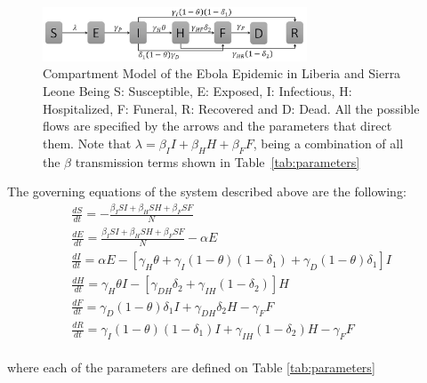 \documentclass[10pt]{article}
\begin{document}
\begin{figure}
  \centering
  \includegraphics[width=0.7\textwidth]{compartment}
  \caption{Compartment Model of the Ebola Epidemic in Liberia and Sierra Leone \newline  Being S: Susceptible, E: Exposed, I: Infectious, H: Hospitalized, F: Funeral,  R: Recovered and D: Dead. All the possible flows are specified by the arrows and the parameters that direct them. Note that $\lambda = \beta_{I}I+\beta_{H}H+\beta_{F}F $, being a combination of all the $\beta$ transmission terms shown in Table~\ref{tab:parameters}} 
\label{fig:compartment} 
\end{figure}

 

 The governing equations of the system described above are the following: \\

\begin{eqnarray} 
\frac{dS}{dt} = - \frac{\beta_{I}SI+\beta_{H}SH+\beta_{F}SF}{N}\\
\frac{dE}{dt} =  \frac{\beta_{I}SI+\beta_{H}SH+\beta_{F}SF}{N}-\alpha E\\
\frac{dI}{dt} =  \alpha E - [\gamma_{H}\theta + \gamma_{I}(1-\theta)(1-\delta_{1})+\gamma_{D}(1-\theta)\delta_{1}]I\\
\frac{dH}{dt} = \gamma_{H}\theta I - [\gamma_{DH}\delta_{2}+\gamma_{IH}(1-\delta_{2})]H\\
\frac{dF}{dt} = \gamma_{D}(1-\theta) \delta_{1} I + \gamma_{DH}\delta_{2} H-\gamma_{F} F\\
\frac{dR}{dt} = \gamma_{I}(1-\theta)(1- \delta_{1}) I + \gamma_{IH}(1-\delta_{2}) H-\gamma_{F} F
\end{eqnarray}\\

where each of the parameters are defined on Table \ref{tab:parameters} \\
\end{document}
